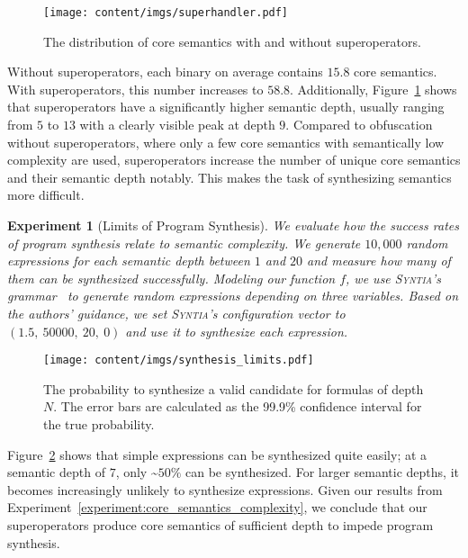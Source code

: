 \documentclass[letterpaper,twocolumn,10pt]{article}
\newcommand{\ex}[1]{Experiment~\ref{#1}}
\theoremstyle{customexample}
\theoremstyle{customexperiment}
\newtheorem{experiment}{Experiment}
\newcommand{\syntia}{\textsc{Syntia}\xspace}
\begin{document}
\begin{figure}[tp]
\centering
    \texttt{[image: content/imgs/superhandler.pdf]}
    \caption{The distribution of core semantics with and without superoperators.}
    \label{fig:superoperator_depths}
    \vspace{-0.6em}
\end{figure}
Without superoperators, each binary on average contains $15.8$ core semantics. With superoperators, this number increases to $58.8$. Additionally, Figure~\ref{fig:superoperator_depths} shows that superoperators have a significantly higher semantic depth, usually ranging from $5$ to $13$ with a clearly visible peak at depth $9$. 
Compared to obfuscation without superoperators, where only a few core semantics with semantically low complexity are used, superoperators increase the number of unique core semantics and their semantic depth notably.
This makes the task of synthesizing semantics more difficult.


\begin{experiment}[Limits of Program Synthesis]\label{experiment:synthesis_limits}
We evaluate how the success rates of program synthesis relate to semantic complexity. We generate $10,000$ random expressions for each semantic depth between $1$ and $20$ and measure how many of them can be synthesized successfully.
Modeling our function $f$, we use \syntia's grammar~\cite{blazytko2017syntia} to generate random expressions depending on three variables. 
Based on the authors' guidance, we set \syntia's configuration vector to $(1.5,~50000,~20,~0)$ and use it to synthesize each expression. \end{experiment}
\begin{figure}[tp]
\centering
    \texttt{[image: content/imgs/synthesis\_limits.pdf]}
    \caption{The probability to synthesize a valid candidate for formulas of depth $N$. The error bars are calculated as the 99.9\% confidence interval for the true probability.}
    \label{fig:synthesis_limits}
    \vspace{-2em}
\end{figure}

Figure~\ref{fig:synthesis_limits} shows that simple expressions can be synthesized quite easily; at a semantic depth of $7$, only \textasciitilde$50\%$ can be synthesized. For larger semantic depths, it becomes increasingly unlikely to synthesize expressions. Given our results from \ex{experiment:core_semantics_complexity}, we conclude that our superoperators produce core semantics of sufficient depth to impede program synthesis.
\end{document}
